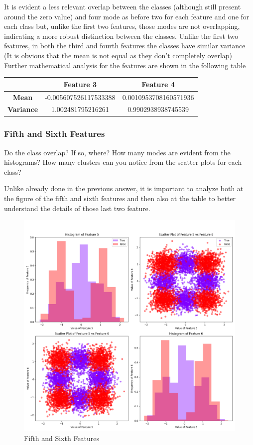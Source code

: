 \documentclass[a4paper, 12pt, english]{article}
\begin{document}
    It is evident a less relevant overlap between the classes (although still present around the zero value) and four mode as before two for each feature and one for each class but, unlike the first two features, those modes are not overlapping, indicating a more robust distinction between the classes. Unlike the first two features, in both the third and fourth features the classes have similar variance (It is obvious that the mean is not equal as they don't completely overlap)
    Further mathematical analysis for the features are shown in the following table
    \begin{table}[htbp]
        \centering
        \begin{tabular}{|c|c|c|}
            \hline
            & \textbf{Feature 3}    & \textbf{Feature 4}    \\
            \hline
            \textbf{Mean}     & -0.005607526117533388 & 0.0010953708160571936 \\
            \hline
            \textbf{Variance} & 1.002481795216261     & 0.9902938938745539    \\
            \hline
        \end{tabular}
    \end{table}

    \subsubsection{Fifth and Sixth Features}\label{project1:3}

    Do the class overlap? If so, where? How many modes are evident from the histograms? How many clusters can you notice from the scatter plots for each class?

    Unlike already done in the previous answer, it is important to analyze both at the figure of the fifth and sixth features and then also at the table to better understand the details of those last two feature.

    \begin{figure}[h]
        \centering
        \includegraphics[width=0.7\linewidth]{img/projects/project1/5-6.png}
        \caption{Fifth and Sixth Features}\label{fig:project1_5-6}
    \end{figure}
\end{document}
